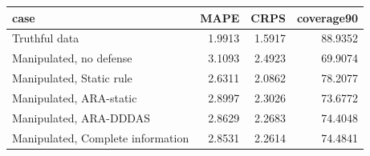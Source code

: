 \begin{tabular}{lrrr}
\toprule
case & MAPE & CRPS & coverage90 \\
\midrule
Truthful data & 1.9913 & 1.5917 & 88.9352 \\
Manipulated, no defense & 3.1093 & 2.4923 & 69.9074 \\
Manipulated, Static rule & 2.6311 & 2.0862 & 78.2077 \\
Manipulated, ARA-static & 2.8997 & 2.3026 & 73.6772 \\
Manipulated, ARA-DDDAS & 2.8629 & 2.2683 & 74.4048 \\
Manipulated, Complete information & 2.8531 & 2.2614 & 74.4841 \\
\bottomrule
\end{tabular}
